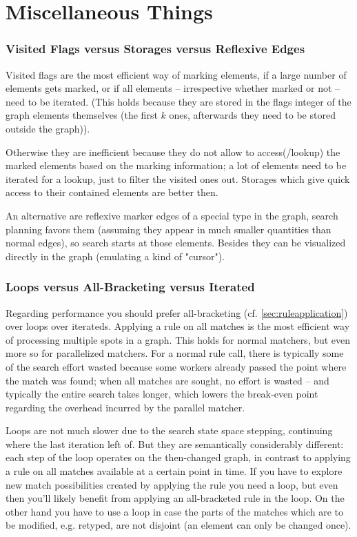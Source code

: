 \section{Miscellaneous Things}

\subsubsection*{Visited Flags versus Storages versus Reflexive Edges}
Visited flags are the most efficient way of marking elements, if a large number of elements gets marked, or if all elements -- irrespective whether marked or not -- need to be iterated.
(This holds because they are stored in the flags integer of the graph elements themselves (the first $k$ ones, afterwards they need to be stored outside the graph)).

Otherwise they are inefficient because they do not allow to access(/lookup) the marked elements based on the marking information;
a lot of elements need to be iterated for a lookup, just to filter the visited ones out.
Storages which give quick access to their contained elements are better then.

An alternative are reflexive marker edges of a special type in the graph, search planning favors them (assuming they appear in much smaller quantities than normal edges),  so search starts at those elements. 
Besides they can be visualized directly in the graph (emulating a kind of "cursor").

\subsubsection*{Loops versus All-Bracketing versus Iterated}
Regarding performance you should prefer all-bracketing (cf. \ref{sec:ruleapplication}) over loops over iterateds.
Applying a rule on all matches is the most efficient way of processing multiple spots in a graph.
This holds for normal matchers, but even more so for parallelized matchers.
For a normal rule call, there is typically some of the search effort wasted because some workers already passed the point where the match was found; when all matches are sought, no effort is wasted -- and typically the entire search takes longer, which lowers the break-even point regarding the overhead incurred by the parallel matcher.

Loops are not much slower due to the search state space stepping, continuing where the last iteration left of.
But they are semantically considerably different: each step of the loop operates on the then-changed graph, in contrast to applying a rule on all matches available at a certain point in time.
If you have to explore new match possibilities created by applying the rule you need a loop, but even then you'll likely benefit from applying an all-bracketed rule in the loop.
On the other hand you have to use a loop in case the parts of the matches which are to be modified, e.g. retyped, are not disjoint (an element can only be changed once).

